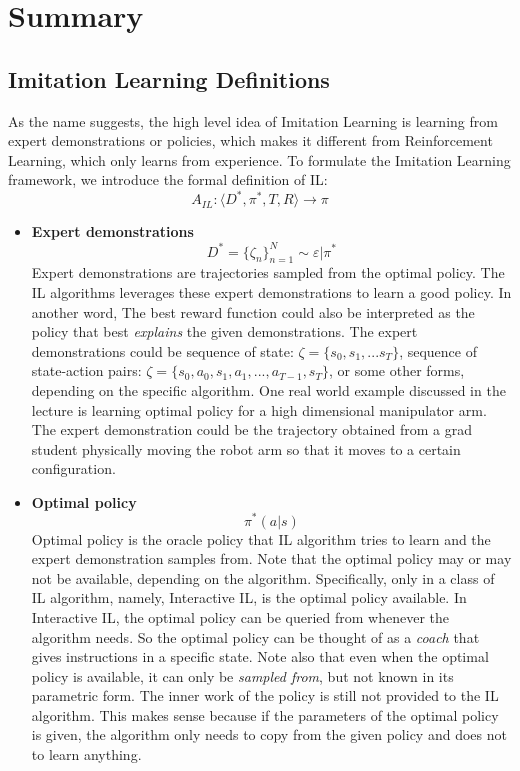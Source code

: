 \documentclass[11pt]{article}
\begin{document}
\section{Summary}
\subsection{Imitation Learning Definitions}
\normalfont
As the name suggests, the high level idea of Imitation Learning is learning from expert demonstrations or policies, which makes it different from Reinforcement Learning, which only  learns from experience. To formulate the Imitation Learning framework, we introduce the formal definition of IL:
\[A_{IL}: \langle D^*,\pi^*, T, R\rangle \rightarrow \pi\]

\begin{itemize}
    \item \textbf{Expert demonstrations}
    \begin{equation}
        D^* = \{\zeta_n\}_{n=1}^N\sim \varepsilon|\pi^*
    \end{equation}
    Expert demonstrations are trajectories sampled from the optimal policy. The IL algorithms leverages these expert demonstrations to learn a good policy. In another word, The best reward function could also be interpreted as the policy that best \textit{explains} the given demonstrations. The expert demonstrations could be sequence of state: $\zeta=\{s_0, s_1,...s_T\}$, sequence of state-action pairs: $\zeta=\{s_0, a_0, s_1, a_1,...,a_{T-1},s_T\}$, or some other forms, depending on the specific algorithm. One real world example discussed in the lecture is learning optimal policy for a high dimensional manipulator arm. The expert demonstration could be the trajectory obtained from a grad student physically moving the robot arm so that it moves to a certain configuration.
    \item \textbf{Optimal policy}
    \begin{equation}
        \pi^*(a|s)
    \end{equation}
    Optimal policy is the oracle policy that IL algorithm tries to learn and the expert demonstration samples from. Note that the optimal policy may or may not be available, depending on the algorithm. Specifically, only in a class of IL algorithm, namely, Interactive IL, is the optimal policy available. In Interactive IL, the optimal policy can be queried from whenever the algorithm needs. So the optimal policy can be thought of as a \textit{coach} that gives instructions in a specific state. Note also that even when the optimal policy is available, it can only be \textit{sampled from}, but not known in its parametric form. The inner work of the policy is still not provided to the IL algorithm. This makes sense because if the parameters of the optimal policy is given, the algorithm only needs to copy from the given policy and does not to learn anything.

\end{itemize}
\end{document}
